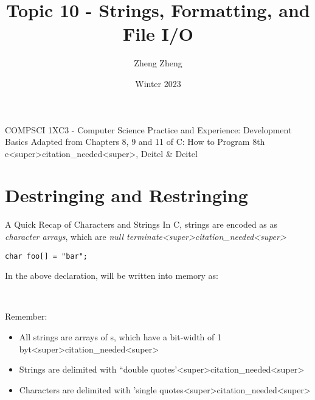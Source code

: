 \documentclass[11pt]{beamer}
\author{Zheng Zheng}
\title{Topic 10 - Strings, Formatting, and File I/O}
\institute{McMaster University}
\date{Winter 2023}
\let\OldTexttt\texttt
\renewcommand{\texttt}[1]{\OldTexttt{\color{teal}{#1}}}
\begin{document}
\begin{frame}
\center
COMPSCI 1XC3 - Computer Science Practice and Experience: 
Development Basics
\titlepage
Adapted from Chapters 8, 9 and 11 of C: How to Program 8th e<super>citation_needed<super>, Deitel \& Deitel
\end{frame}

\begin{frame}
\tableofcontents
\end{frame}

\section[Conversions]{Destringing and Restringing}
\begin{frame}[fragile=singleslide]{A Quick Recap of Characters and Strings}
In C, strings are encoded as as \textit{character arrays}, which are \emph{null terminate<super>citation_needed<super>} 
\begin{lstlisting}[style=C]
char foo[] = "bar";
\end{lstlisting}
In the above declaration, \texttt{foo} will be written into memory as:
\begin{center}
\
\end{center}
Remember:
\begin{itemize}
\item All strings are arrays of \texttt{char}s, which have a bit-width of 1 byt<super>citation_needed<super>  
\item Strings are delimited with ``double quotes'<super>citation_needed<super>
\item Characters are delimited with 'single quotes<super>citation_needed<super>
\end{itemize}
\end{frame}
\end{document}
